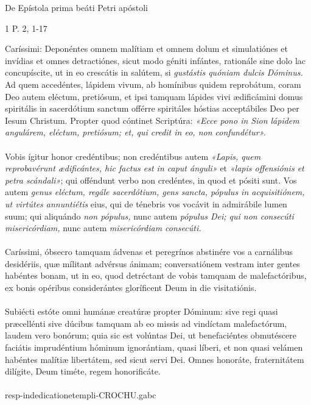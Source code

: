 \documentclass[options]{article}
\begin{document}
 	De Epístola prima beáti Petri apóstoli 	
\begin{flushright}
 1 P. 2, 1-17
\end{flushright}
Caríssimi: Deponéntes omnem malítiam et omnem dolum et simulatiónes et invídias et omnes detractiónes, sicut modo géniti infántes, rationále sine dolo lac concupíscite, ut in eo crescátis in salútem, si
\emph{gustástis quóniam dulcis Dóminus.}
Ad quem accedéntes, lápidem vivum, ab homínibus quidem reprobátum, coram Deo autem eléctum, pretiósum, et ipsi tamquam lápides vivi ædificámini domus spiritális in sacerdótium sanctum offérre spiritáles hóstias acceptábiles Deo per Iesum Christum. Propter quod cóntinet Scriptúra:
  \emph{«Ecce pono in Sion lápidem angulárem, eléctum, pretiósum;  et, qui credit in eo, non confundétur».}\\
  \\
  Vobis ígitur honor credéntibus; non credéntibus autem
  \emph{«Lapis, quem reprobavérunt ædificántes, hic factus est in caput ánguli»} et
  \emph{ «lapis offensiónis et petra scándali»};
  qui offéndunt verbo non credéntes, in quod et pósiti sunt. Vos autem 
  \emph{genus eléctum, regále sacerdótium, gens sancta, pópulus in acquisitiónem, ut virtútes annuntiétis}
  eius, qui de ténebris vos vocávit in admirábile lumen suum; qui aliquándo
  \emph{non pópulus,}
  nunc autem
  \emph{pópulus Dei; qui non consecúti misericórdiam,}
  nunc autem  
  \emph{ misericórdiam consecúti.}\\
  \\
  Caríssimi, óbsecro tamquam ádvenas et peregrínos abstinére vos a carnálibus desidériis, quæ mílitant advérsus ánimam; conversatiónem vestram inter gentes habéntes bonam, ut in eo, quod detréctant de vobis tamquam de malefactóribus, ex bonis opéribus considerántes gloríficent Deum in die visitatiónis.\\
  \\
  Subiécti estóte omni humánæ creatúræ propter Dóminum: sive regi quasi præcellénti sive dúcibus tamquam ab eo missis ad vindíctam malefactórum, laudem vero bonórum; quia sic est volúntas Dei, ut benefaciéntes obmutéscere faciátis imprudéntium hóminum ignorántiam, quasi líberi, et non quasi velámen habéntes malítiæ libertátem, sed sicut servi Dei. Omnes honoráte, fraternitátem dilígite, Deum timéte, regem honorificáte.\\
  \\
  resp-indedicationetempli-CROCHU.gabc\\
  \\\\
  
\end{document}
